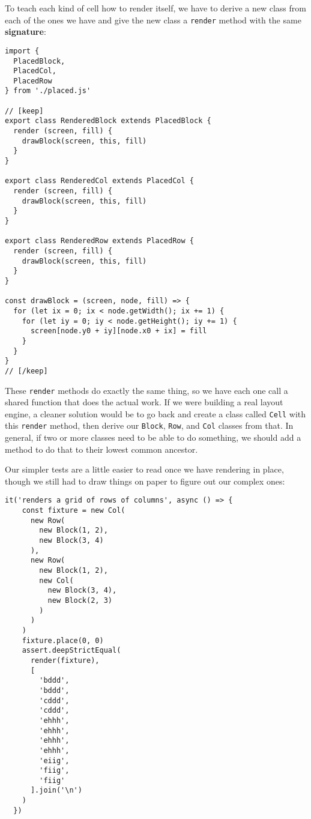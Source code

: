 \documentclass[krantzl]{krantz}
\newcommand{\glossref}[1]{\textbf{#1}}
\begin{document}
To teach each kind of cell how to render itself,
we have to derive a new class from each of the ones we have
and give the new class a \texttt{render} method with the same \glossref{signature}:


\begin{lstlisting}[frame=tblr]
import {
  PlacedBlock,
  PlacedCol,
  PlacedRow
} from './placed.js'

// [keep]
export class RenderedBlock extends PlacedBlock {
  render (screen, fill) {
    drawBlock(screen, this, fill)
  }
}

export class RenderedCol extends PlacedCol {
  render (screen, fill) {
    drawBlock(screen, this, fill)
  }
}

export class RenderedRow extends PlacedRow {
  render (screen, fill) {
    drawBlock(screen, this, fill)
  }
}

const drawBlock = (screen, node, fill) => {
  for (let ix = 0; ix < node.getWidth(); ix += 1) {
    for (let iy = 0; iy < node.getHeight(); iy += 1) {
      screen[node.y0 + iy][node.x0 + ix] = fill
    }
  }
}
// [/keep]
\end{lstlisting}



\noindent These \texttt{render} methods do exactly the same thing,
so we have each one call a shared function that does the actual work.
If we were building a real layout engine,
a cleaner solution would be to go back and create a class called \texttt{Cell} with this \texttt{render} method,
then derive our \texttt{Block}, \texttt{Row}, and \texttt{Col} classes from that.
In general,
if two or more classes need to be able to do something,
we should add a method to do that to their lowest common ancestor.


Our simpler tests are a little easier to read once we have rendering in place,
though we still had to draw things on paper to figure out our complex ones:


\begin{lstlisting}[frame=tblr]
  it('renders a grid of rows of columns', async () => {
    const fixture = new Col(
      new Row(
        new Block(1, 2),
        new Block(3, 4)
      ),
      new Row(
        new Block(1, 2),
        new Col(
          new Block(3, 4),
          new Block(2, 3)
        )
      )
    )
    fixture.place(0, 0)
    assert.deepStrictEqual(
      render(fixture),
      [
        'bddd',
        'bddd',
        'cddd',
        'cddd',
        'ehhh',
        'ehhh',
        'ehhh',
        'ehhh',
        'eiig',
        'fiig',
        'fiig'
      ].join('\n')
    )
  })
\end{lstlisting}
\end{document}
